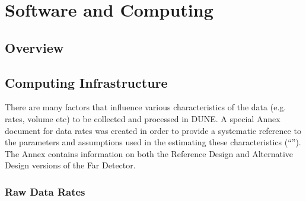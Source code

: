 \chapter{Software and Computing}
\label{ch:detectors-sc}

\section{Overview}


\section{Computing Infrastructure}
\label{sec:detectors-sc-infrastructure}

There are many factors that influence various characteristics of the
data (e.g. rates, volume etc) to be collected and processed in DUNE.
A special Annex document for data rates was created in order to
provide a systematic reference to the parameters and assumptions used
in the estimating these characteristics (``\anxrates'').  The Annex
contains information on both the Reference Design and Alternative
Design versions of the Far Detector.

\subsection{Raw Data Rates}
\label{sec:detectors-sc-infrastructure-data-rates}


